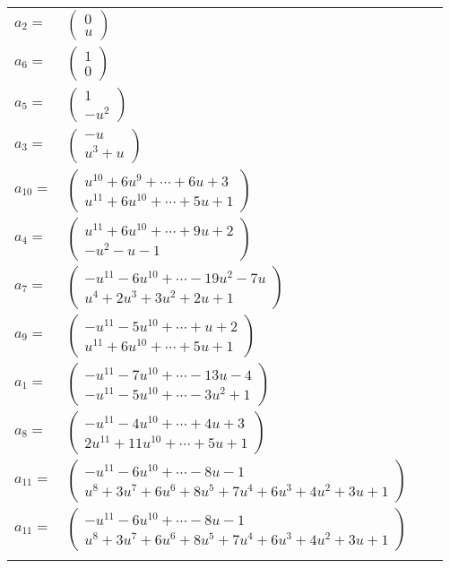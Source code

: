\documentclass[1p]{elsarticle_modified}
\theoremstyle{definition}
\begin{document}
\begin{tabular}{m{7pt} m{180pt} m{7pt} m{180pt} }
\flushright $a_{2}=$&$\begin{pmatrix}0\\u\end{pmatrix}$ \\
\flushright $a_{6}=$&$\begin{pmatrix}1\\0\end{pmatrix}$ \\
\flushright $a_{5}=$&$\begin{pmatrix}1\\- u^2\end{pmatrix}$ \\
\flushright $a_{3}=$&$\begin{pmatrix}- u\\u^3+u\end{pmatrix}$ \\
\flushright $a_{10}=$&$\begin{pmatrix}u^{10}+6 u^9+\cdots+6 u+3\\u^{11}+6 u^{10}+\cdots+5 u+1\end{pmatrix}$ \\
\flushright $a_{4}=$&$\begin{pmatrix}u^{11}+6 u^{10}+\cdots+9 u+2\\- u^2- u-1\end{pmatrix}$ \\
\flushright $a_{7}=$&$\begin{pmatrix}- u^{11}-6 u^{10}+\cdots-19 u^2-7 u\\u^4+2 u^3+3 u^2+2 u+1\end{pmatrix}$ \\
\flushright $a_{9}=$&$\begin{pmatrix}- u^{11}-5 u^{10}+\cdots+u+2\\u^{11}+6 u^{10}+\cdots+5 u+1\end{pmatrix}$ \\
\flushright $a_{1}=$&$\begin{pmatrix}- u^{11}-7 u^{10}+\cdots-13 u-4\\- u^{11}-5 u^{10}+\cdots-3 u^2+1\end{pmatrix}$ \\
\flushright $a_{8}=$&$\begin{pmatrix}- u^{11}-4 u^{10}+\cdots+4 u+3\\2 u^{11}+11 u^{10}+\cdots+5 u+1\end{pmatrix}$ \\
\flushright $a_{11}=$&$\begin{pmatrix}- u^{11}-6 u^{10}+\cdots-8 u-1\\u^8+3 u^7+6 u^6+8 u^5+7 u^4+6 u^3+4 u^2+3 u+1\end{pmatrix}$\\ \flushright $a_{11}=$&$\begin{pmatrix}- u^{11}-6 u^{10}+\cdots-8 u-1\\u^8+3 u^7+6 u^6+8 u^5+7 u^4+6 u^3+4 u^2+3 u+1\end{pmatrix}$\\&\end{tabular}
\end{document}
